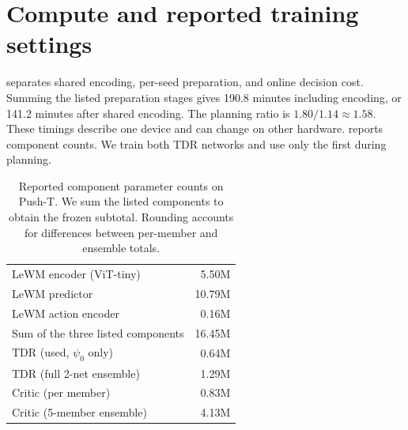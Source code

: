 \documentclass{article}
\theoremstyle{definition}
\theoremstyle{remark}
\begin{document}
\section{Compute and reported training settings}
\label{app:params}
 separates shared encoding, per-seed preparation, and online
decision cost. Summing the listed preparation stages gives 190.8 minutes including
encoding, or 141.2 minutes after shared encoding.
The planning ratio is $1.80/1.14\approx1.58$.
These timings describe one device and can change on other hardware.
 reports component counts. We train both TDR networks and use
only the first during planning.
\begin{table}[h]
\centering\small
\caption{Reported component parameter counts on Push-T. We sum the listed components to obtain the frozen subtotal. Rounding accounts for differences between per-member and ensemble totals.}
\label{tab:params}
\begin{tabular}{lr}
\toprule
LeWM encoder (ViT-tiny) & 5.50M \\
LeWM predictor & 10.79M \\
LeWM action encoder & 0.16M \\
\quad Sum of the three listed components & 16.45M \\
\midrule
TDR (used, $\psi_0$ only) & 0.64M \\
TDR (full 2-net ensemble) & 1.29M \\
Critic (per member) & 0.83M \\
Critic (5-member ensemble) & 4.13M \\
\bottomrule
\end{tabular}
\end{table}
\end{document}
